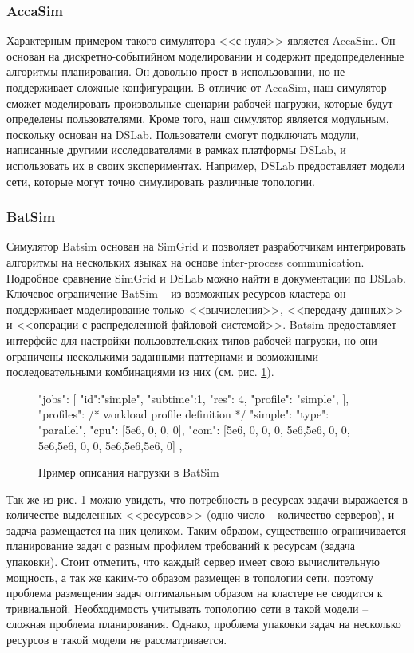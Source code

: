 \subsubsection{AccaSim}

Характерным примером такого симулятора <<с нуля>> является AccaSim\cite{accasim-article}. Он основан на дискретно-событийном моделировании и содержит предопределенные алгоритмы планирования. Он довольно прост в использовании, но не поддерживает сложные конфигурации. В отличие от AccaSim, наш симулятор сможет моделировать произвольные сценарии рабочей нагрузки, которые будут определены пользователями. Кроме того, наш симулятор является модульным, поскольку основан на DSLab. Пользователи смогут подключать модули, написанные другими исследователями в рамках платформы DSLab, и использовать их в своих экспериментах. Например, DSLab предоставляет модели сети, которые могут точно симулировать различные топологии.

\subsubsection{BatSim}

Симулятор Batsim основан на SimGrid\cite{simgrid-article} и позволяет разработчикам интегрировать алгоритмы на нескольких языках на основе inter-process communication. Подробное сравнение SimGrid и DSLab можно найти в документации по DSLab\cite{dslab-analog-cmp}. Ключевое ограничение BatSim -- из возможных ресурсов кластера он поддерживает моделирование только <<вычисления>>, <<передачу данных>> и <<операции с распределенной файловой системой>>. Batsim предоставляет интерфейс для настройки пользовательских типов рабочей нагрузки, но они ограничены несколькими заданными паттернами и возможными последовательными комбинациями из них (см. рис. \ref{fig:batsim-profile}). 

\begin{figure}[h]
    \footnotesize  
\begin{jsoncode}
"jobs": [
  {"id":"simple", "subtime":1, "res": 4, "profile": "simple"},
],
"profiles": {
  /* workload profile definition */
  "simple": {
    "type": "parallel",
    "cpu": [5e6,  0,  0,  0],
    "com": [5e6,  0,  0,  0,
            5e6,5e6,  0,  0,
            5e6,5e6,  0,  0,
            5e6,5e6,5e6,  0]
  },
}
\end{jsoncode}
\caption{Пример описания нагрузки в BatSim}
\label{fig:batsim-profile}
\end{figure}

Так же из рис. \ref{fig:batsim-profile} можно увидеть, что потребность в ресурсах задачи выражается в количестве выделенных <<ресурсов>> (одно число -- количество серверов), и задача размещается на них целиком. Таким образом, существенно ограничивается планирование задач с разным профилем требований к ресурсам (задача упаковки). Стоит отметить, что каждый сервер имеет свою вычислительную мощность, а так же каким-то образом размещен в топологии сети, поэтому проблема размещения задач оптимальным образом на кластере не сводится к тривиальной. Необходимость учитывать топологию сети в такой модели -- сложная проблема планирования. Однако, проблема упаковки задач на несколько ресурсов в такой модели не рассматривается.

